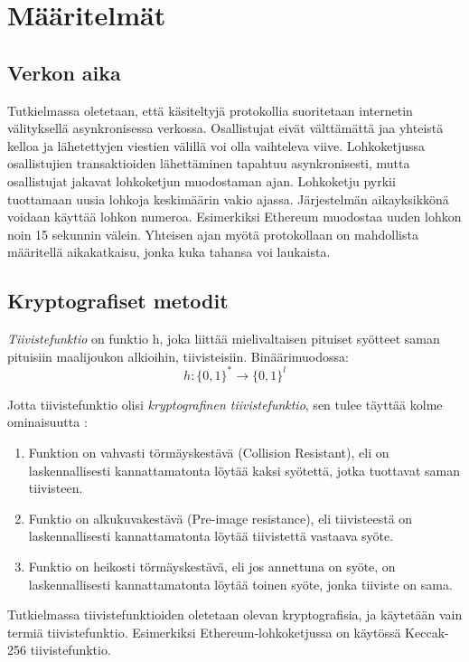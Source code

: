 \chapter{Määritelmät\label{methods}}

\section{Verkon aika}
Tutkielmassa oletetaan, että käsiteltyjä protokollia suoritetaan internetin välityksellä asynkronisessa verkossa. Osallistujat eivät välttämättä jaa yhteistä kelloa ja lähetettyjen viestien välillä voi olla vaihteleva viive. Lohkoketjussa osallistujien transaktioiden lähettäminen tapahtuu asynkronisesti, mutta osallistujat jakavat lohkoketjun muodostaman ajan. Lohkoketju pyrkii tuottamaan uusia lohkoja keskimäärin vakio ajassa. Järjestelmän aikayksikkönä voidaan käyttää lohkon numeroa. Esimerkiksi Ethereum muodostaa uuden lohkon noin 15 sekunnin välein. Yhteisen ajan myötä protokollaan on mahdollista määritellä aikakatkaisu, jonka kuka tahansa voi laukaista.


\section{Kryptografiset metodit}
\textit{Tiivistefunktio} on funktio h, joka liittää mielivaltaisen pituiset syötteet saman pituisiin maalijoukon alkioihin, tiivisteisiin. Binäärimuodossa: 
\begin{equation}
    h : \{0, 1\}^* \longrightarrow  \{0, 1\}^l
\end{equation}

Jotta tiivistefunktio olisi \textit{kryptografinen tiivistefunktio}, sen tulee täyttää kolme ominaisuutta \cite{cryptoeprint:2011:565}: 
\begin{enumerate}
    \item Funktion on vahvasti törmäyskestävä (Collision Resistant), eli on laskennallisesti kannattamatonta löytää kaksi syötettä, jotka tuottavat saman tiivisteen.
    \item Funktio on alkukuvakestävä (Pre-image resistance), eli tiivisteestä on laskennallisesti kannattamatonta löytää tiivistettä vastaava syöte.
    \item Funktio on heikosti törmäyskestävä, eli jos annettuna on syöte, on laskennallisesti kannattamatonta löytää toinen syöte, jonka tiiviste on sama.
\end{enumerate}

Tutkielmassa tiivistefunktioiden oletetaan olevan kryptografisia, ja käytetään vain termiä tiivistefunktio. Esimerkiksi Ethereum-lohkoketjussa on käytössä Keccak-256 tiivistefunktio.

